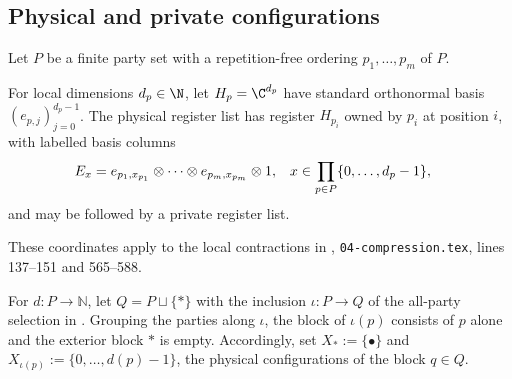
\subsection{Physical and private configurations}

Let $P$ be a finite party set with a repetition-free ordering $p_1,\ldots,p_m$ of $P$.

\begin{definition}
    \label{def:peps_family_physical_output}
    \leanok
    For local dimensions $d_p\in\N$, let $H_p=\C^{d_p}$ have standard orthonormal basis $(e_{p,j})_{j=0}^{d_p-1}$. The physical register list has register $H_{p_i}$ owned by $p_i$ at position $i$, with labelled basis columns
    \begin{align}
        E_x & = e_{p_1,x_{p_1}}\otimes\cdots\otimes e_{p_m,x_{p_m}}\otimes1, &
        x   & \in \prod_{p\in P}\{0,\ldots,d_p-1\}, \notag
    \end{align}
    and may be followed by a private register list.
\end{definition}

These coordinates apply to the local contractions in
\cite[proof of Theorem~5.2]{OpenAI2026PolynomialPEPS},
\texttt{04-compression.tex}, lines 137--151 and 565--588.



\begin{definition}
    \label{def:peps_selected_family_physical_basis}
    \leanok
    For $d:P\to\mathbb N$, let $Q=P\sqcup\{*\}$ with the inclusion $\iota:P\to Q$ of the all-party selection in \cite[proof of Theorem~5.2]{OpenAI2026PolynomialPEPS}. Grouping the parties along $\iota$, the block of $\iota(p)$ consists of $p$ alone and the exterior block $*$ is empty. Accordingly, set $X_*:=\{\bullet\}$ and $X_{\iota(p)}:=\{0,\ldots,d(p)-1\}$, the physical configurations of the block $q\in Q$.
\end{definition}



